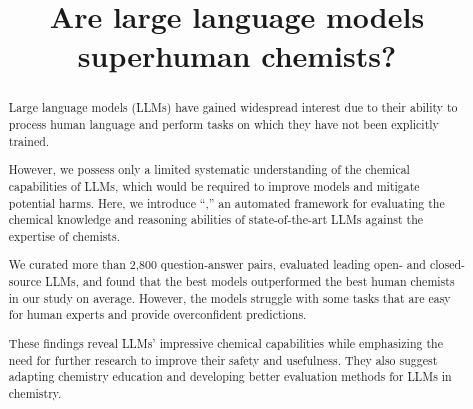 \documentclass[11pt, oneside]{article}
\title{\textsf{Are large language models superhuman chemists?}}
\begin{document}
\maketitle

\clearpage
\begin{abstract}
Large language models (LLMs) have gained widespread interest due to their ability to process human language and perform tasks on which they have not been explicitly trained.

However, we possess only a limited systematic understanding of the chemical capabilities of LLMs, which would be required to improve models and mitigate potential harms.
Here, we introduce \enquote{\chembench,} an automated framework for evaluating the chemical knowledge and reasoning abilities of state-of-the-art LLMs against the expertise of chemists.

We curated more than 2,800 question-answer pairs, evaluated leading open- and closed-source LLMs, and found that the best models outperformed the best human chemists in our study on average.
However, the models struggle with some tasks that are easy for human experts and provide overconfident predictions.

These findings reveal LLMs' impressive chemical capabilities while emphasizing the need for further research to improve their safety and usefulness. They also suggest adapting chemistry education and developing better evaluation methods for LLMs in chemistry.
\end{abstract}
\end{document}
